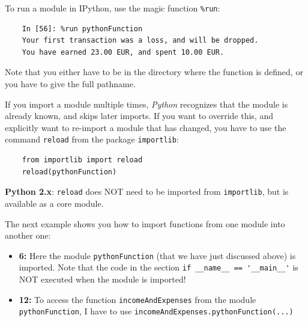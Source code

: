To run a module in IPython, use the magic function \lstinline{%run}:

\begin{lstlisting}
    In [56]: %run pythonFunction
    Your first transaction was a loss, and will be dropped.
    You have earned 23.00 EUR, and spent 10.00 EUR.
\end{lstlisting}

Note that you either have to be in the directory where the function is defined, or you have to give the full pathname.

If you import a module multiple times, \emph{Python} recognizes that the module is already known, and skips later imports. If you want to override this, and explicitly want to re-import a module that has changed, you have to use the command \lstinline{reload} from the package \lstinline{importlib}:

\begin{lstlisting}
    from importlib import reload
    reload(pythonFunction)
\end{lstlisting}

\textbf{Python 2.x}: \lstinline{reload} does NOT need to be imported from \lstinline{importlib}, but is available as a core module.

The next example shows you how to import functions from one module into another one:



\begin{itemize}
  \item \textbf{6:} Here the module \lstinline{pythonFunction} (that we have just discussed above) is imported. Note that the code in the section \lstinline{if __name__ == '__main__'} is NOT executed when the module is imported!

  \item \textbf{12:} To access the function \lstinline{incomeAndExpenses} from the module \lstinline{pythonFunction}, I have to use \lstinline{incomeAndExpenses.pythonFunction(...)}
\end{itemize}

